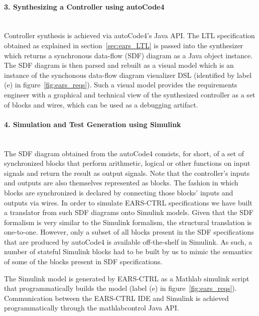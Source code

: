\paragraph{3. Synthesizing a Controller using \textsf{autoCode4}\\\\}
 
Controller synthesis is achieved via \textsf{autoCode4}'s Java API. The LTL
specification obtained as explained in section~\ref{sec:ears_LTL} is passed into
the synthesizer which returns a synchronous data-flow (SDF) diagram as a Java
object instance. The SDF diagram is then parsed and rebuilt as a visual model
which is an instance of the synchonous data-flow diagram visualizer DSL
(identified by label (\textsf{e}) in figure~\ref{fig:ears_reqs}). Such a visual
model provides the requirements engineer with a graphical and technical view of
the synthesized controller as a set of blocks and wires, which can be used as a
debugging artifact.

\paragraph{4. Simulation and Test Generation using Simulink\\\\}

The SDF diagram obtained from the \textsf{autoCode4} consists, for short, of a
set of synchronized blocks that perform arithmetic, logical or other functions
on input signals and return the result as output signals. Note that the
controller's inputs and outputs are also themselves represented as blocks. The
fashion in which blocks are synchronized is declared by connecting those blocks'
inputs and outputs via wires. In order to simulate \textsf{EARS-CTRL}
specifications we have built a translator from such SDF diagrams onto Simulink
models. Given that the SDF formalism is very similar to the Simulink formalism,
the structural translation is  one-to-one. However, only a subset of all blocks
present in the SDF specifications that are produced by \textsf{autoCode4} is
available off-the-shelf in Simulink. As such, a number of stateful Simulink
blocks had to be built by us to mimic the semantics of some of the blocks
present in SDF specifications.

The Simulink model is generated by \textsf{EARS-CTRL} as a Mathlab simulink
script that programmatically builds the model (label (\textsf{e}) in
figure~\ref{fig:ears_reqs}). Communication between the \textsf{EARS-CTRL} IDE
and Simulink is achieved programmatically through the
\textsf{mathlabcontrol}\cite{mathlabcontrol} Java API.
